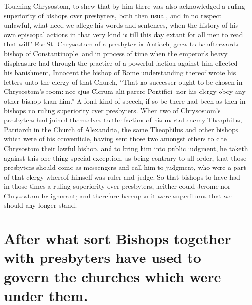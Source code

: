 Touching Chrysostom, to shew that by him there was also acknowledged a ruling superiority of bishops over presbyters, both then usual, and in no respect unlawful, what need we allege his words and sentences, when the history of his own episcopal actions in that very kind is till this day extant for all men to read that will? For St. Chrysostom of a presbyter in Antioch, grew to be afterwards bishop of Constantinople; and in process of time when the emperor’s heavy displeasure had through the practice of a powerful faction against him effected his banishment, Innocent the bishop of Rome understanding thereof wrote his letters unto the clergy of that Church, “That no successor ought to be chosen in Chrysostom’s room: nec ejus Clerum alii parere Pontifici, nor his clergy obey any other bishop than him.” A fond kind of speech, if so be there had been as then in bishops no ruling  superiority over presbyters.
 When two of Chrysostom’s presbyters had joined themselves to the faction of his mortal enemy Theophilus, Patriarch in the Church of Alexandria, the same Theophilus and other bishops which were of his conventicle, having sent those two amongst others to cite Chrysostom their lawful bishop, and to bring him into public judgment, he taketh against this one thing special exception, as being contrary to all order, that those presbyters should come as messengers and call him to judgment, who were a part of that clergy whereof himself was ruler and judge. So that bishops to have had in those times a ruling superiority over presbyters, neither could Jerome nor Chrysostom be ignorant; and therefore hereupon it were superfluous that we should any longer stand.

\section*{After what sort Bishops together with presbyters have used to govern the churches which were under them.}

